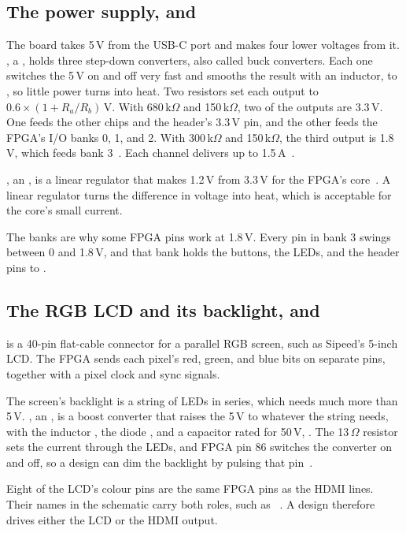 \documentclass[11pt,a4paper]{article}
\begin{document}
\subsection*{The power supply,  and }

The board takes 5\,V from the USB-C port and makes four lower voltages from it. , a , holds three step-down converters, also called buck converters. Each one switches the 5\,V on and off very fast and smooths the result with an inductor,  to , so little power turns into heat. Two resistors set each output to $0.6 \times (1 + R_a/R_b)$\,V. With 680\,k$\Omega$ and 150\,k$\Omega$, two of the outputs are 3.3\,V. One feeds the other chips and the header’s 3.3\,V pin, and the other feeds the FPGA’s I/O banks 0, 1, and 2. With 300\,k$\Omega$ and 150\,k$\Omega$, the third output is 1.8\,V, which feeds bank 3~\cite[p.~3]{schematic}. Each channel delivers up to 1.5\,A~\cite{tmi}.

, an , is a linear regulator that makes 1.2\,V from 3.3\,V for the FPGA’s core~\cite[p.~3]{schematic}. A linear regulator turns the difference in voltage into heat, which is acceptable for the core’s small current.

The banks are why some FPGA pins work at 1.8\,V. Every pin in bank 3 swings between 0 and 1.8\,V, and that bank holds the buttons, the LEDs, and the header pins  to .

\subsection*{The RGB LCD and its backlight,  and }

 is a 40-pin flat-cable connector for a parallel RGB screen, such as Sipeed’s 5-inch LCD. The FPGA sends each pixel’s red, green, and blue bits on separate pins, together with a pixel clock and sync signals.

The screen’s backlight is a string of LEDs in series, which needs much more than 5\,V. , an , is a boost converter that raises the 5\,V to whatever the string needs, with the inductor , the diode , and a capacitor rated for 50\,V, . The 13\,$\Omega$ resistor  sets the current through the LEDs, and FPGA pin 86 switches the converter on and off, so a design can dim the backlight by pulsing that pin~\cite[p.~2]{schematic}.

Eight of the LCD’s colour pins are the same FPGA pins as the HDMI lines. Their names in the schematic carry both roles, such as ~\cite[p.~2]{schematic}. A design therefore drives either the LCD or the HDMI output.
\end{document}
